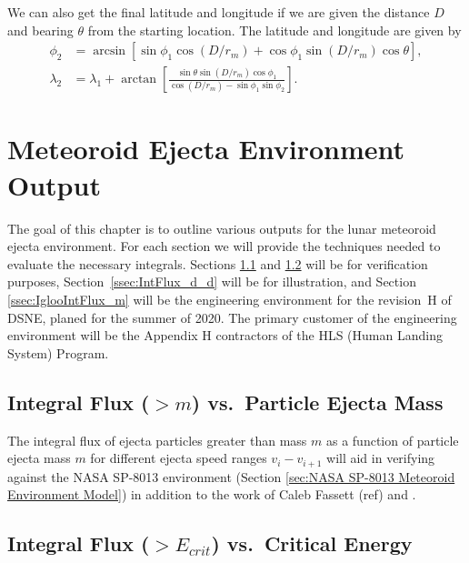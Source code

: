 \documentclass{hitec}
\numberwithin{equation}{section}
\begin{document}
We can also get the final latitude and longitude if we are given the distance $D$ and bearing $\theta$ from the starting location. The latitude and longitude are given by
\begin{align}
\phi_2 &= \arcsin\left[\sin\phi_1\cos(D/r_m) + \cos\phi_1\sin(D/r_m)\cos\theta\right], \\
\lambda_2 &= \lambda_1 + \arctan\left[\frac{\sin\theta\sin(D/r_m)\cos\phi_1}{\cos(D/r_m) - \sin\phi_1\sin\phi_2}\right].
\end{align}


\section{Meteoroid Ejecta Environment Output}

The goal of this chapter is to outline various outputs for the lunar meteoroid ejecta environment. For each section we will provide the techniques needed to evaluate the necessary integrals. Sections \ref{ssec:IntFlux_m_m} and \ref{ssec:IntFlux_Ec_Ec} will be for verification purposes, Section~\ref{ssec:IntFlux_d_d} will be for illustration, and Section \ref{ssec:IglooIntFlux_m} will be the engineering environment for the revision~H of DSNE, planed for the summer of 2020. The primary customer of the engineering environment will be the Appendix H contractors of the HLS (Human Landing System) Program.


\subsection{Integral Flux ($>m$) vs.\ Particle Ejecta Mass}\label{ssec:IntFlux_m_m}

The integral flux of ejecta particles greater than mass $m$ as a function of particle ejecta mass $m$ for different ejecta speed ranges $v_{i}-v_{i+1}$ will aid in verifying against the NASA SP-8013 environment (Section \ref{sec:NASA SP-8013 Meteoroid Environment Model}) in addition to the work of Caleb Fassett (ref) and \cite{bjorkman2019astronaut}.


\subsection{Integral Flux ($>E_{crit}$) vs.\ Critical Energy}\label{ssec:IntFlux_Ec_Ec}
\end{document}
